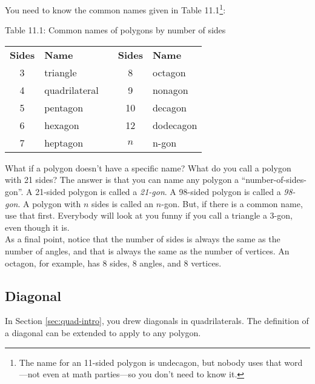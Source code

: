 You need to know the common names given in 
Table 11.1\footnote{
The name for an 11-sided polygon is undecagon,
but nobody uses that word---not even at math parties---so 
you don't need to know it.}:
\begin{center}
Table 11.1:  Common names of polygons by number of sides\\

\label{table:polygon-names}
\begin{tabular}{@{ } c l  c  c l @{ }}
\toprule
{\bfseries Sides}&{\bfseries Name} &  \qquad \qquad & {\bfseries Sides}&{\bfseries Name} \\
\cmidrule(lr){1-2}\cmidrule(lr){4-5}
3 & triangle 	&& 8 		& octagon \\
4 & quadrilateral && 9		& nonagon\\
5 & pentagon 	&& 10 		& decagon\\
6 & hexagon 	&& 12 		& dodecagon\\
7 & heptagon 	&& $n$	& n-gon \\
\bottomrule
\end{tabular}
\end{center}

\vspace{0.5cm}

What if a polygon doesn't have a specific name? 
What do you call a polygon with 21 sides?
The answer is that you can name any polygon a ``number-of-sides-gon''.
A 21-sided polygon is called a \emph{21-gon}. 
A 98-sided polygon is called a \emph{98-gon}.
A polygon with $n$ sides is called an $n$-gon.
But, if there is a common name, use that first.
Everybody will look at you funny if you call a triangle a 3-gon,
even though it is.\\

As a final point, 
notice that the number of sides is always the same as the number of angles,
and that is always the same as the number of vertices.
An octagon, for example, has 8 sides, 8 angles, and 8 vertices.

\subsection{Diagonal}

In Section \ref{sec:quad-intro}, 
you drew diagonals in quadrilaterals. 
The definition of a diagonal can be extended to apply to any polygon.


